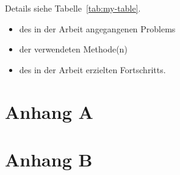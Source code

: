 \documentclass[oneside]{ausarbeitung}
\begin{document}
Details siehe Tabelle~\ref{tab:my-table}.


  \begin{itemize}
    \item des in der Arbeit angegangenen Problems
    \item der verwendeten Methode(n)
    \item des in der Arbeit erzielten Fortschritts.
  \end{itemize}

\appendix

\printbibliography[heading=bibintoc]

\chapter{Anhang A}

\Blindtext

\chapter{Anhang B}

\Blindtext
\end{document}
